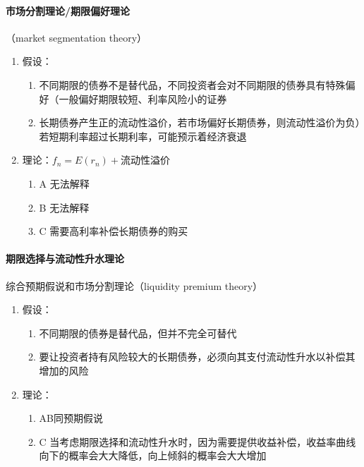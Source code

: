 \documentclass[12pt]{book}
\begin{document}
\paragraph{市场分割理论/期限偏好理论}

（market segmentation theory）


\begin{enumerate}[1.]
    \item 假设：
          \begin{enumerate}[(1)]
              \item 不同期限的债券不是替代品，不同投资者会对不同期限的债券具有特殊偏好（一般偏好期限较短、利率风险小的证券
              \item 长期债券产生正的流动性溢价，若市场偏好长期债券，则流动性溢价为负）若短期利率超过长期利率，可能预示着经济衰退
          \end{enumerate}
    \item 理论：$f_n=E\left(r_n\right)+\text{流动性溢价}$
          \begin{enumerate}[(1)]
              \item A 无法解释
              \item B 无法解释
              \item C 需要高利率补偿长期债券的购买
          \end{enumerate}
\end{enumerate}


\paragraph{期限选择与流动性升水理论}

综合预期假说和市场分割理论（liquidity premium theory）



\begin{enumerate}[1.]
    \item 假设：
          \begin{enumerate}[(1)]
              \item 不同期限的债券是替代品，但并不完全可替代
              \item 要让投资者持有风险较大的长期债券，必须向其支付流动性升水以补偿其增加的风险
          \end{enumerate}
    \item 理论：
          \begin{enumerate}[(1)]
              \item AB同预期假说
              \item C 当考虑期限选择和流动性升水时，因为需要提供收益补偿，收益率曲线向下的概率会大大降低，向上倾斜的概率会大大增加
          \end{enumerate}
\end{enumerate}
\end{document}
